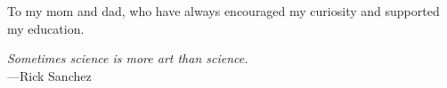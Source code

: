 %
\begin{frontmatter}

%
%
\makefrontmatter

%
%
%
%
%
%
\begin{dedication}
 To my mom and dad, who have always encouraged my curiosity and supported my education. 
\end{dedication}


%
%



%
%
\begin{epigraph} %
  \emph{Sometimes science is more art than science.}\\
  ---Rick Sanchez
\end{epigraph}

%


%
\tableofcontents
\listoffigures  %
\listoftables   %




\end{frontmatter}
